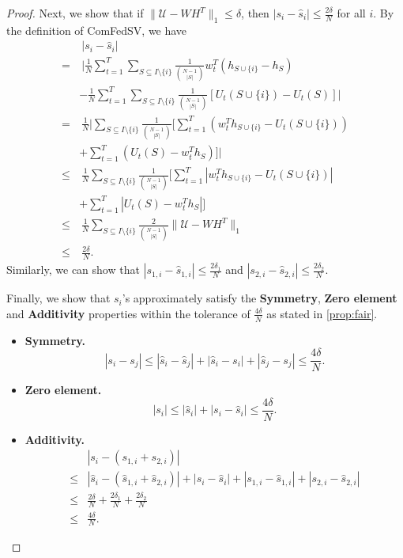 \begin{proof}
Next, we show that if $\|\mathcal{U} - WH^T\|_1 \leq \delta$, then $|s_i - \hat s_i| \leq \frac{2\delta}{N}$ for all $i$. By the definition of ComFedSV, we have 
\begin{align*}
    &~|s_i - \hat s_i| 
    \\= &~\biggl| \frac{1}{N} \sum_{t=1}^T\sum\limits_{S \subseteq I \setminus\{i\}} \frac{1}{\binom{N-1}{|S|}} w_t^T(h_{S\cup\{i\}} - h_S) 
    \\&- \frac{1}{N} \sum_{t=1}^T\sum\limits_{S \subseteq I \setminus\{i\}} \frac{1}{\binom{N-1}{|S|}} \left[ U_t(S \cup\{i\}) - U_t(S)\right] \biggr|\\
    = &~\frac{1}{N}\biggl| \sum\limits_{S \subseteq I \setminus\{i\}} \frac{1}{\binom{N-1}{|S|}} \biggl[ \sum_{t=1}^T \left(w_t^Th_{S\cup\{i\}} - U_t(S\cup\{i\})\right) 
    \\&+  \sum_{t=1}^T \left(U_t(S) - w_t^Th_{S}\right) \biggr]\biggr|\\
    \leq &~\frac{1}{N}\sum\limits_{S \subseteq I \setminus\{i\}} \frac{1}{\binom{N-1}{|S|}}\biggl[ \sum_{t=1}^T \left|w_t^Th_{S\cup\{i\}} - U_t(S\cup\{i\})\right| 
    \\&+  \sum_{t=1}^T \left|U_t(S) - w_t^Th_{S}\right| \biggr]\\
    \leq &~\frac{1}{N}\sum\limits_{S \subseteq I \setminus\{i\}} \frac{2}{\binom{N-1}{|S|}} \|\mathcal{U} - WH^T\|_1 \\
    \leq &~\frac{2\delta}{N}.
\end{align*}
Similarly, we can show that $|s_{1,i} - \hat s_{1,i}| \leq \frac{2\delta_1}{N}$ and $|s_{2,i} - \hat s_{2,i}| \leq \frac{2\delta_2}{N}$. 

Finally, we show that $s_i$'s approximately satisfy the \textbf{Symmetry}, \textbf{Zero element} and \textbf{Additivity} properties within the tolerance of $\frac{4\delta}{N}$ as stated in \autoref{prop:fair}.
\begin{itemize}
    \item \textbf{Symmetry.} 
    \[|s_i - s_j| \leq |\hat s_i - \hat s_j| + |\hat s_i - s_i| + |\hat s_j - s_j| \leq \frac{4\delta}{N}.\]
    \item \textbf{Zero element.}
    \[|s_i| \leq |\hat s_i| + |s_i - \hat s_i|\leq \frac{4\delta}{N}.\]
    \item \textbf{Additivity.}
    \begin{align*}
            &|s_i - (s_{1,i} + s_{2,i})| 
        \\ \leq &|\hat s_i - (\hat s_{1,i} + \hat s_{2,i})| + |s_i - \hat s_i| + |s_{1,i} - \hat s_{1,i}| + |s_{2,i} - \hat s_{2,i}|
        \\ \leq &\frac{2\delta}{N} + \frac{2\delta_1}{N} + \frac{2\delta_2}{N} 
        \\\leq &\frac{4\delta}{N}.
    \end{align*}
\end{itemize}
\end{proof}
